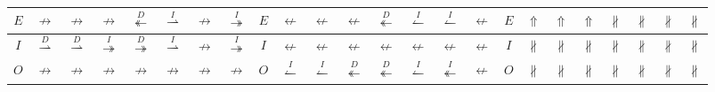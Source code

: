 \documentclass{llncs}
\begin{document}
\begin{table}[htbp]
\begin{tabular}{|c|c|c|c|c|c|c|c!{\vrule width 1.5pt}c|c|c|c|c|c|c|c!{\vrule width 1.5pt}c|c|c|c|c|c|c|c|}
	$E$ & $\nrightarrow$ & $\nrightarrow$ & $\nrightarrow$ & $\overset{D}{\twoheadleftarrow}$ & $\overset{I}{\rightharpoonup}$ & $\nrightarrow$ & $\overset{I}{\twoheadrightarrow}$ &
	$E$ & $\nleftarrow$ & $\nleftarrow$ & $\nleftarrow$ & $\overset{D}{\twoheadleftarrow}$ & $\overset{I}{\leftharpoonup}$ & $\overset{I}{\leftharpoonup}$ & $\nleftarrow$ &
	$E$ & $\Uparrow$ & $\Uparrow$ & $\Uparrow$ & $\nparallel$ & $\nparallel$ & $\nparallel$ & $\nparallel$\\ \hline

	$I$ & $\overset{D}{\rightharpoonup}$ & $\overset{D}{\rightharpoonup}$ & $\overset{I}{\twoheadrightarrow}$ & $\overset{D}{\twoheadrightarrow}$ & $\overset{I}{\rightharpoonup}$ & $\nrightarrow$ & $\overset{I}{\twoheadrightarrow}$ &
	$I$ & $\nleftarrow$ & $\nleftarrow$ & $\nleftarrow$ & $\nleftarrow$ & $\nleftarrow$ & $\nleftarrow$ & $\nleftarrow$ &
	$I$ & $\nparallel$ & $\nparallel$ & $\nparallel$ & $\nparallel$ & $\nparallel$ & $\nparallel$ & $\nparallel$\\ \hline

	$O$ & $\nrightarrow$ & $\nrightarrow$ & $\nrightarrow$ & $\nrightarrow$ & $\nrightarrow$ & $\nrightarrow$ & $\nrightarrow$ &
	$O$ & $\overset{I}{\leftharpoonup}$ & $\overset{I}{\leftharpoonup}$ & $\overset{D}{\twoheadleftarrow}$ & $\overset{D}{\twoheadleftarrow}$ & $\overset{I}{\leftharpoonup}$ & $\overset{I}{\twoheadleftarrow}$ & $\nleftarrow$ &
	$O$ & $\nparallel$ & $\nparallel$ & $\nparallel$ & $\nparallel$ & $\nparallel$ & $\nparallel$ & $\nparallel$\\ \hline
\end{tabular}
\end{table}

\end{document}
